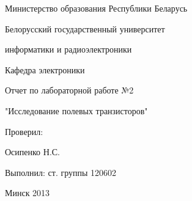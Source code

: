 \thispagestyle{empty}

\begin{center}
Министерство образования Республики Беларусь\par
\vspace{2mm}
Белорусский государственный университет\par
информатики и радиоэлектроники\par
\vspace{2mm}
Кафедра электроники\par

\end{center}

\vspace{50mm}

\begin{center}
Отчет по лабораторной работе №2\par
"Исследование полевых транзисторов"\par
\end{center}

\vspace{50mm}

\begin{multicols}{2}
Проверил: 

Осипенко Н.С.
\vspace{40mm}

\begin{flushright}

Выполнил: ст. группы 120602

\end{flushright}
\end{multicols}

\vspace{50mm}
\begin{center}
{Минск 2013}
\end{center}

\newpage
